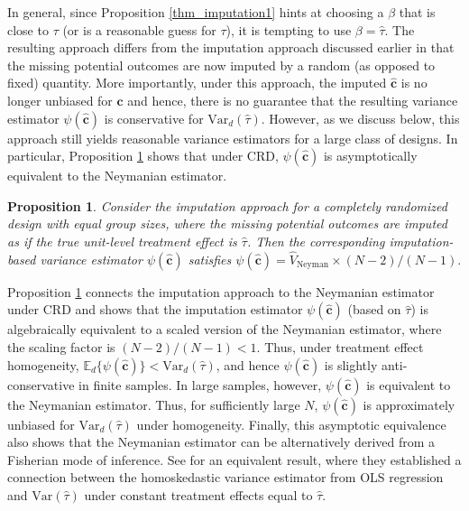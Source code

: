 \documentclass[12pt]{article}
\newcommand{\Var}{{\text{Var}}}
\newcommand{\E}{{\mathbb{E}}}
\newtheorem{proposition}[theorem]{Proposition}
\begin{document}
In general, since Proposition \ref{thm_imputation1} hints at choosing a $\beta$ that is close to $\tau$ (or is a reasonable guess for $\tau$), it is tempting to use $\beta = \hat{\tau}$. The resulting approach differs from the imputation approach discussed earlier in that the missing potential outcomes are now imputed by a random (as opposed to fixed) quantity. More importantly, under this approach, the imputed $\hat{\bm{c}}$ is no longer unbiased for $\bm{c}$ and hence, there is no guarantee that the resulting variance estimator $\psi(\hat{\bm{c}})$ is conservative for $\Var_d(\hat{\tau})$. 
However, as we discuss below, this approach still yields reasonable variance estimators for a large class of designs.
In particular, Proposition \ref{prop_imputation_neyman} shows that under CRD, $\psi(\hat{\bm{c}})$ is asymptotically equivalent to the Neymanian estimator.
\begin{proposition} \normalfont
 Consider the imputation approach for a completely randomized design with equal group sizes, where the missing potential outcomes are imputed as if the true unit-level treatment effect is $\hat{\tau}$. Then the corresponding imputation-based variance estimator $\psi(\hat{\bm{c}})$ satisfies $\psi(\hat{\bm{c}}) = \hat{V}_{\text{Neyman}}\times (N-2)/(N-1).$
 \label{prop_imputation_neyman}
\end{proposition}
Proposition \ref{prop_imputation_neyman} connects the imputation approach to the Neymanian estimator under CRD and shows that the imputation estimator $\psi(\hat{\bm{c}})$ (based on $\hat{\tau}$) is algebraically equivalent to a scaled version of the Neymanian estimator, where the scaling factor is $(N-2)/(N-1)<1$. 
Thus, under treatment effect homogeneity, $\E_d\{\psi(\hat{\bm{c}})\} <\Var_d(\hat{\tau})$, and hence $\psi(\hat{\bm{c}})$ is slightly anti-conservative in finite samples. In large samples, however, $\psi(\hat{\bm{c}})$ is equivalent to the Neymanian estimator. Thus, for sufficiently large $N$, $\psi(\hat{\bm{c}})$ is approximately unbiased for $\Var_d(\hat{\tau})$ under homogeneity. 
Finally, this asymptotic equivalence also shows that the Neymanian estimator can be alternatively derived from a Fisherian mode of inference. See \cite{samii2012equivalencies} for an equivalent result, where they established a connection between the homoskedastic variance estimator from OLS regression and $\Var(\hat{\tau})$ under constant treatment effects equal to $\hat{\tau}$.
\end{document}
